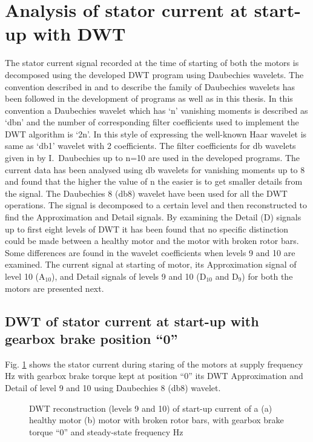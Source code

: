 \documentclass[a4paper,11pt]{report}
\begin{document}
\section{Analysis of stator current at start-up with DWT}
The stator current signal recorded at the time of starting of both the motors is decomposed using the developed DWT program using Daubechies wavelets. The convention described in \cite{stark} and \cite{waveletug} to describe the family of Daubechies wavelets has been followed in the development of programs as well as in this thesis. In this convention a Daubechies wavelet which has `n' vanishing moments is described as `dbn' and the number of corresponding filter coefficients used to implement the DWT algorithm is `2n'. In this style of expressing the well-known Haar wavelet is same as `db1' wavelet with 2 coefficients. The filter coefficients for db wavelets given in \cite{daub} by I.~Daubechies up to n=10 are used in the developed programs. The current data has been analysed using db wavelets for vanishing moments up to 8 and found that the higher the value of n the easier is to get smaller details from the signal. The Daubechies 8 (db8) wavelet have been used for all the DWT operations. The signal is decomposed to a certain level and then reconstructed to find the Approximation and Detail signals. By examining the Detail (D) signals up to first eight levels of DWT it has been found that no specific distinction could be made between a healthy motor and the motor with broken rotor bars. Some differences are found in the wavelet coefficients when levels 9 and 10 are examined. The current signal at starting of motor, its Approximation signal of level 10 ($\textrm{A}_{10}$), and Detail signals of levels 9 and 10 ($\textrm{D}_{10}$ and $\textrm{D}_{9}$) for both the motors are presented next. 

\clearpage
\subsection{DWT of stator current at start-up with gearbox brake position ``0''}

Fig. \ref{hb030st} shows the stator current during staring of the motors at supply frequency \unit[30]{Hz} with gearbox brake torque kept at position ``0'' its DWT Approximation and Detail of level 9 and 10 using Daubechies 8 (db8) wavelet.

\begin{figure}[h]
\centering
\subfigure[]{\texttt{[image: h030st]}}
\subfigure[]{\texttt{[image: b030st]}}
\caption{DWT reconstruction (levels 9 and 10) of start-up current of a (a) healthy motor (b) motor with broken rotor bars, with gearbox brake torque ``0'' and steady-state frequency \unit[30]{Hz}} \label{hb030st}
\end{figure}
\end{document}
